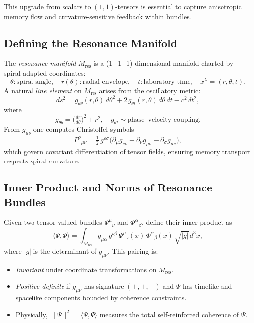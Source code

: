 This upgrade from scalars to \((1,1)\)-tensors is essential to capture anisotropic memory flow and curvature‐sensitive feedback within bundles.

\subsection{Defining the Resonance Manifold}

The \emph{resonance manifold} \(M_{\mathrm{res}}\) is a (1+1+1)-dimensional manifold charted by spiral‐adapted coordinates:
\[
  \theta:\text{spiral angle},\quad
  r(\theta):\text{radial envelope},\quad
  t:\text{laboratory time},
  \quad
  x^{\lambda}=(r,\theta,t).
\]
A natural \emph{line element} on \(M_{\mathrm{res}}\) arises from the oscillatory metric:
\[
  ds^{2}
  = g_{\theta\theta}(r,\theta)\,d\theta^{2}
    + 2\,g_{\theta t}(r,\theta)\,d\theta\,dt
    - c^{2}\,dt^{2},
\]
where
\[
  g_{\theta\theta}
  = \bigl(\tfrac{dr}{d\theta}\bigr)^{2} + r^{2},\quad
  g_{\theta t}\sim \text{phase–velocity coupling}.
\]
From \(g_{\mu\nu}\) one computes Christoffel symbols
\[
  \Gamma^{\rho}{}_{\mu\nu}
  = \tfrac12\,g^{\rho\sigma}
    \bigl(\partial_{\mu}g_{\nu\sigma}
         + \partial_{\nu}g_{\mu\sigma}
         - \partial_{\sigma}g_{\mu\nu}\bigr),
\]
which govern covariant differentiation of tensor fields, ensuring memory transport respects spiral curvature.

\subsection{Inner Product and Norms of Resonance Bundles}

Given two tensor‐valued bundles \(\Psi^{\mu}{}_{\nu}\) and \(\Phi^{\alpha}{}_{\beta}\), define their inner product as
\[
  \langle\Psi,\Phi\rangle
  = \int_{M_{\mathrm{res}}}
    g_{\mu\alpha}\,g^{\nu\beta}\,
    \Psi^{\mu}{}_{\nu}(x)\,\Phi^{\alpha}{}_{\beta}(x)\,
    \sqrt{|g|}\,d^{3}x,
\]
where \(|g|\) is the determinant of \(g_{\mu\nu}\).  This pairing is:

\begin{itemize}
  \item \emph{Invariant} under coordinate transformations on \(M_{\mathrm{res}}\).
  \item \emph{Positive‐definite} if \(g_{\mu\nu}\) has signature \((+,+,-)\) and \(\Psi\) has timelike and spacelike components bounded by coherence constraints.
  \item Physically, \(\|\Psi\|^{2} = \langle\Psi,\Psi\rangle\) measures the total self‐reinforced coherence of \(\Psi\).
\end{itemize}

